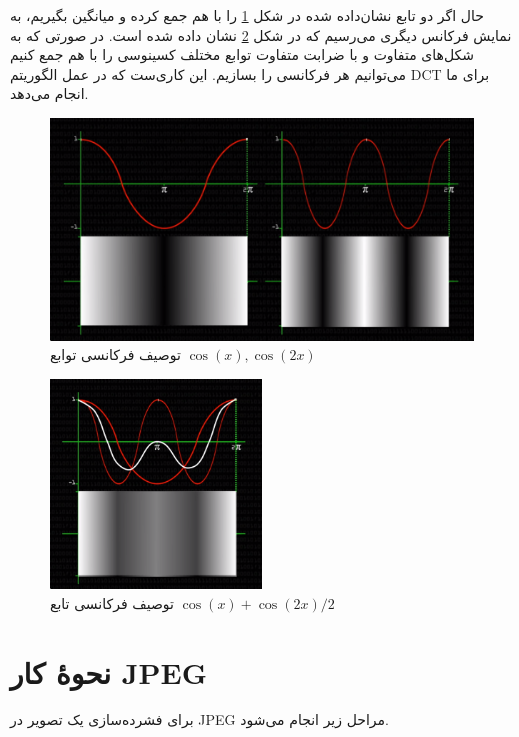 حال اگر دو تابع نشان‌داده شده در 
شکل 
\ref{freq_1}
را با هم جمع کرده و میانگین بگیریم، به نمایش فرکانس دیگری می‌رسیم که در شکل 
\ref{freq_2}
نشان داده شده است.
در صورتی که به شکل‌های متفاوت و با ضرابت متفاوت توابع مختلف کسینوسی را با هم جمع کنیم می‌توانیم هر فرکانسی را بسازیم. این کاری‌ست که در 
عمل الگوریتم 
DCT برای ما انجام می‌دهد.
\begin{figure}[]
        \centering
        \includegraphics[width=\textwidth]{figs/freq_1.png}
        \caption{توصیف فرکانسی توابع 
        $\cos (x) , \cos (2x)$ \cite{youtube}}
        \label{freq_1}
\end{figure}

\begin{figure}[]
        \centering
        \includegraphics[width=0.5\textwidth]{figs/freq_2.png}
        \caption{توصیف فرکانسی تابع 
        $\cos (x) + \cos (2x) / 2$ \cite{youtube}}
        \label{freq_2}
\end{figure}

\section{نحوهٔ کار JPEG}
برای فشرده‌سازی یک تصویر در JPEG 
مراحل زیر انجام می‌شود. 

